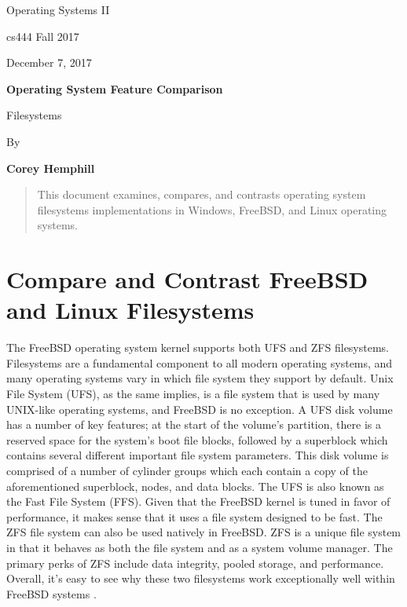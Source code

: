 \documentclass[letterpaper,10pt,draftclsnofoot,onecolumn]{IEEEtran}
\def \Author{Corey Hemphill}
\def \Title{Operating System Feature Comparison}
\def \Subtitle{Filesystems}
\def \Term{cs444 Fall 2017}
\def \DueDate{December 7, 2017}
\def \DocType{
	Operating Systems II
}
\begin{document}
\begin{titlepage}
    \begin{singlespace}
        \hfill  
        \par\vspace{.2in}
        \centering
        \scshape {
            \huge  \DocType \par
           	\huge \Term \par
            {\large \DueDate}\par
            \vspace{.5in}
            \textbf{\Huge \Title}\par
            {\large \Subtitle}\par
            \vspace{.5in}          
            {\large By }\par
           	\textbf{\Author}\par
            \vspace{5pt}
            }
            \vspace{120pt}
        
        \begin{abstract}
        This document examines, compares, and contrasts operating system filesystems implementations in Windows, FreeBSD, and Linux operating systems.
        \end{abstract}
        
    \end{singlespace}
\end{titlepage}
\newpage

\section{Compare and Contrast FreeBSD and Linux Filesystems}
\noindent  The FreeBSD operating system kernel supports both UFS and ZFS filesystems. Filesystems are a fundamental component to all modern operating systems, and many operating systems vary in which file system they support by default. Unix File System (UFS), as the same implies, is a file system that is used by many UNIX-like operating systems, and FreeBSD is no exception. A UFS disk volume has a number of key features; at the start of the volume’s partition, there is a reserved space for the system’s boot file blocks, followed by a superblock which contains several different important file system parameters. This disk volume is comprised of a number of cylinder groups which each contain a copy of the aforementioned superblock, nodes, and data blocks. The UFS is also known as the Fast File System (FFS). Given that the FreeBSD kernel is tuned in favor of performance, it makes sense that it uses a file system designed to be fast. The ZFS file system can also be used natively in FreeBSD. ZFS is a unique file system in that it behaves as both the file system and as a system volume manager. The primary perks of ZFS include data integrity, pooled storage, and performance. Overall, it’s easy to see why these two filesystems work exceptionally well within FreeBSD systems \cite{FreeBSD1FS} \cite{FreeBSD2FS} \cite{FreeBSD3FS}.\\
\end{document}
